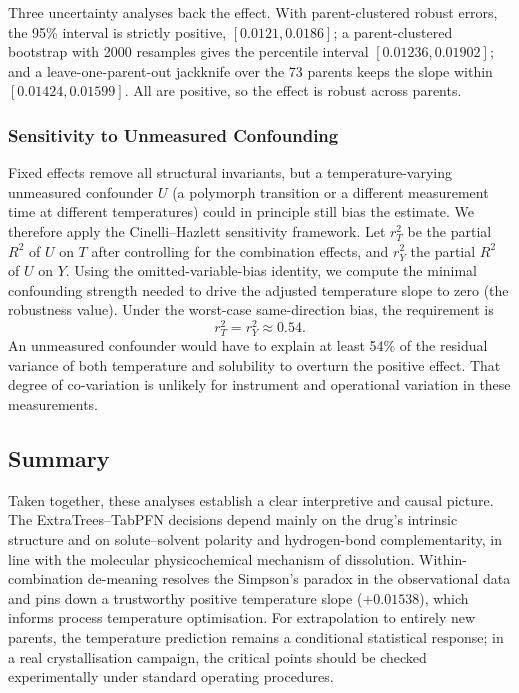 Three uncertainty analyses back the effect. With parent-clustered robust errors, the 95\% interval is strictly positive, $[0.0121, 0.0186]$; a parent-clustered bootstrap with 2000 resamples gives the percentile interval $[0.01236, 0.01902]$; and a leave-one-parent-out jackknife over the 73 parents keeps the slope within $[0.01424, 0.01599]$. All are positive, so the effect is robust across parents.

\subsubsection{Sensitivity to Unmeasured Confounding}

Fixed effects remove all structural invariants, but a temperature-varying unmeasured confounder $U$ (a polymorph transition or a different measurement time at different temperatures) could in principle still bias the estimate. We therefore apply the Cinelli--Hazlett sensitivity framework\cite{sensitivity2020}. Let $r_T^2$ be the partial $R^2$ of $U$ on $T$ after controlling for the combination effects, and $r_Y^2$ the partial $R^2$ of $U$ on $Y$. Using the omitted-variable-bias identity, we compute the minimal confounding strength needed to drive the adjusted temperature slope to zero (the robustness value). Under the worst-case same-direction bias, the requirement is
\begin{equation}
r_T^2 = r_Y^2 \approx 0.54.
\end{equation}
An unmeasured confounder would have to explain at least 54\% of the residual variance of both temperature and solubility to overturn the positive effect. That degree of co-variation is unlikely for instrument and operational variation in these measurements.

\subsection{Summary}

Taken together, these analyses establish a clear interpretive and causal picture. The ExtraTrees--TabPFN decisions depend mainly on the drug's intrinsic structure and on solute--solvent polarity and hydrogen-bond complementarity, in line with the molecular physicochemical mechanism of dissolution. Within-combination de-meaning resolves the Simpson's paradox in the observational data and pins down a trustworthy positive temperature slope ($+0.01538$), which informs process temperature optimisation. For extrapolation to entirely new parents, the temperature prediction remains a conditional statistical response; in a real crystallisation campaign, the critical points should be checked experimentally under standard operating procedures.
